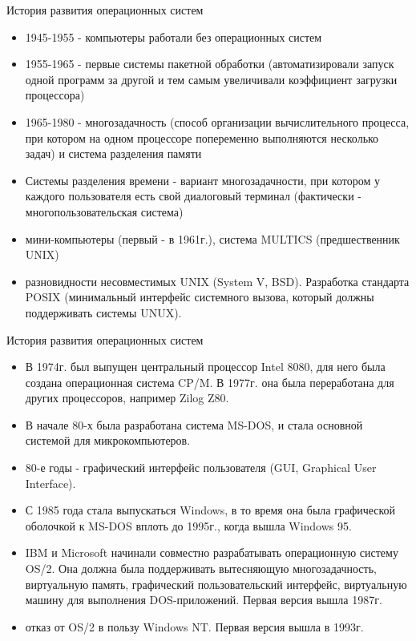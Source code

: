 \documentclass{beamer}
\begin{document}
\begin{frame}[t]
История развития операционных систем
\begin{itemize}
\item 1945-1955 - компьютеры работали без операционных систем
\item 1955-1965 - первые системы пакетной обработки (автоматизировали запуск одной программ за другой и тем самым увеличивали коэффициент загрузки процессора)
\item 1965-1980 - многозадачность (способ организации вычислительного процесса, при котором на одном процессоре попеременно выполняются несколько задач) и система разделения памяти
\item Системы разделения времени - вариант многозадачности, при котором у каждого пользователя есть свой диалоговый терминал (фактически - многопользовательская система)
\item мини-компьютеры (первый - в 1961г.), система MULTICS (предшественник UNIX)
\item разновидности несовместимых UNIX (System V, BSD). Разработка стандарта POSIX (минимальный интерфейс системного вызова, который должны поддерживать системы UNUX).
\end{itemize}
\end{frame} 

\begin{frame}[t]
История развития операционных систем
\begin{itemize}
\item В 1974г. был выпущен центральный процессор Intel 8080, для него была создана операционная система CP/M. В 1977г. она была переработана для других процессоров, например Zilog Z80.
\item В начале 80-х была разработана система MS-DOS, и стала основной системой для микрокомпьютеров.
\item 80-е годы - графический интерфейс пользователя (GUI, Graphical User Interface).
\item С 1985 года стала выпускаться Windows, в то время она была графической оболочкой к MS-DOS вплоть до 1995г., когда вышла Windows 95.
\item IBM и Microsoft начинали совместно разрабатывать операционную систему OS/2. Она должна была поддерживать вытесняющую многозадачность, виртуальную память, графический пользовательский интерфейс, виртуальную машину для выполнения DOS-приложений. Первая версия вышла 1987г.
\item отказ от OS/2 в пользу Windows NT. Первая версия вышла в 1993г.
\end{itemize}
\end{frame} 
\end{document}
